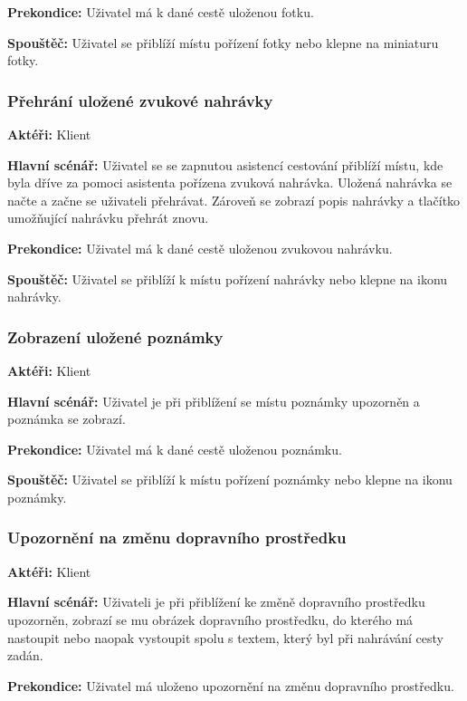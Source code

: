 \documentclass[czech,master,public,dept460,male,java,cpdeclaration]{diploma}
\newcommand{\usecase}[2]{\subsubsection{#1}\label{#2}}
\begin{document}
\vspace{0.1cm}
\noindent
\textbf{Prekondice:} Uživatel má k dané cestě uloženou fotku.

\vspace{0.1cm}
\noindent
\textbf{Spouštěč:} Uživatel se přiblíží místu pořízení fotky nebo klepne na miniaturu fotky.


\usecase{Přehrání uložené zvukové nahrávky}{prehraninahravky}
\textbf{Aktéři:} Klient

\vspace{0.1cm}
\noindent
\textbf{Hlavní scénář:} Uživatel se se zapnutou asistencí cestování přiblíží místu,
kde byla dříve za pomoci asistenta pořízena zvuková nahrávka. Uložená nahrávka se načte
a začne se uživateli přehrávat. Zároveň se zobrazí popis nahrávky a tlačítko umožňující
nahrávku přehrát znovu.

\vspace{0.1cm}
\noindent
\textbf{Prekondice:} Uživatel má k dané cestě uloženou zvukovou nahrávku.

\vspace{0.1cm}
\noindent
\textbf{Spouštěč:} Uživatel se přiblíží k místu pořízení nahrávky nebo klepne na ikonu nahrávky.

\usecase{Zobrazení uložené poznámky}{zobrazenipoznamky}
\textbf{Aktéři:} Klient

\vspace{0.1cm}
\noindent
\textbf{Hlavní scénář:} Uživatel je při přiblížení se místu poznámky upozorněn a poznámka se zobrazí.

\vspace{0.1cm}
\noindent
\textbf{Prekondice:} Uživatel má k dané cestě uloženou poznámku.

\vspace{0.1cm}
\noindent
\textbf{Spouštěč:} Uživatel se přiblíží k místu pořízení poznámky nebo klepne na ikonu poznámky.

\usecase{Upozornění na změnu dopravního prostředku}{upozorneniprostredek}
\textbf{Aktéři:} Klient

\vspace{0.1cm}
\noindent
\textbf{Hlavní scénář:} Uživateli je při přiblížení ke změně dopravního prostředku upozorněn,
zobrazí se mu obrázek dopravního prostředku, do kterého má nastoupit nebo naopak vystoupit spolu
s textem, který byl při nahrávání cesty zadán.

\vspace{0.1cm}
\noindent
\textbf{Prekondice:} Uživatel má uloženo upozornění na změnu dopravního prostředku.
\end{document}
